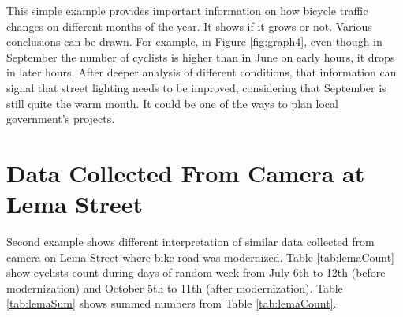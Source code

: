 This simple example provides important information on how bicycle traffic changes on different months of the year. It shows if it grows or not. Various conclusions can be drawn. For example, in Figure \ref{fig:graph4}, even though in September the number of cyclists is higher than in June on early hours, it drops in later hours. After deeper analysis of different conditions, that information can signal that street lighting needs to be improved, considering that September is still quite the warm month. It could be one of the ways to plan local government's projects.
\section{Data Collected From Camera at Lema Street}
\label{sec:lema}
Second example shows different interpretation of similar data collected from camera on Lema Street where bike road was modernized. Table \ref{tab:lemaCount} show cyclists count during days of random week from July 6th to 12th (before modernization) and October 5th to 11th (after modernization). Table \ref{tab:lemaSum} shows summed numbers from Table \ref{tab:lemaCount}. 
